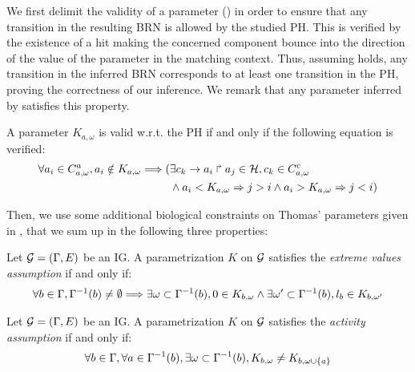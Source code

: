 We first delimit the validity of a parameter () in order to ensure that any
transition in the resulting BRN is allowed by the studied PH.
This is verified by the existence of a hit making the concerned component bounce into the direction
of the value of the parameter in the matching context.
Thus, assuming  holds, any transition in the inferred BRN corresponds to at least
one transition in the PH, proving the correctness of our inference.
We remark that any parameter inferred by  satisfies this property.

\begin{property}\label{pro:K-valid}
A parameter $K_{a,\omega}$ is valid w.r.t. the PH if and only if the following equation is verified:
\begin{align*}
  \forall a_i\in C^a_{a,\omega}, a_i \notin K_{a,\omega} \Longrightarrow
    (& \exists c_k\rightarrow a_i\Rsh a_j\in\mathcal{H}, c_k \in C^c_{a,\omega} \\
     & \wedge a_i < K_{a,\omega} \Rightarrow j > i \wedge  a_i > K_{a,\omega} \Rightarrow j <i )
\end{align*}
\end{property}

Then, we use some additional biological constraints on Thomas' parameters given in
\cite{BernotSemBRN}, that we sum up in the following three properties:

\begin{property}
Let $\mathcal{G} = (\Gamma, E)$ be an IG. A parametrization $K$ on $\mathcal{G}$ satisfies the \emph{extreme values assumption} if and only if:
\label{pro:param_enum_extreme}
\begin{align*}
  \forall b \in \Gamma, \Gamma^{-1}(b) \neq \emptyset \Longrightarrow \exists \omega \subset \Gamma^{-1}(b), 0 \in K_{b,\omega} \wedge \exists \omega' \subset \Gamma^{-1}(b), l_b \in K_{b,\omega'}
\end{align*}
\end{property}

\begin{property}
\label{pro:param_enum_activity}
Let $\mathcal{G} = (\Gamma, E)$ be an IG. A parametrization $K$ on $\mathcal{G}$ satisfies the \emph{activity assumption} if and only if:
\begin{align*}
  \forall b \in \Gamma, \forall a \in \Gamma^{-1}(b), \exists \omega \subset \Gamma^{-1}(b), K_{b,\omega} \neq K_{b,\omega \cup \{ a \}}
\end{align*}
\end{property}

